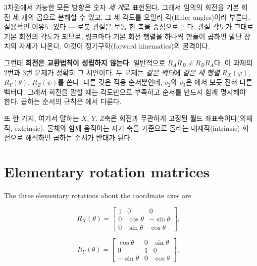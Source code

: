 3차원에서 가능한 모든 방향은 숫자 \emph{세 개}로 표현된다. 그래서 임의의 회전을
기본 회전 세 개의 곱으로 분해할 수 있고, 그 세 각도를 오일러 각(Euler angles)이라
부른다. 실용적인 이유도 있다 --- 로봇 관절은 보통 한 축을 중심으로 돈다. 관절 각도가
그대로 기본 회전의 각도가 되므로, 링크마다 기본 회전 행렬을 하나씩 만들어 곱하면
말단 장치의 자세가 나온다. 이것이 정기구학(forward kinematics)의 골격이다.

그런데 \textbf{회전은 교환법칙이 성립하지 않는다}. 일반적으로
$R_A R_B \neq R_B R_A$다. 이 과제의 2번과 3번 문제가 정확히 그 시연이다. 두 문제는
\emph{같은 벡터}에 \emph{같은 세 행렬} $R_X(\varphi)$, $R_Y(\theta)$,
$R_Z(\psi)$를 쓴다. 다른 것은 적용 순서뿐인데, $v_2$와 $v_3$은
에서 보듯 전혀 다른 벡터다. 그래서 회전을 말할 때는 각도만으로
부족하고 순서를 반드시 함께 명시해야 한다. 곱하는 순서의 규칙은
에서 다룬다.

또 한 가지, 여기서 말하는 $X$, $Y$, $Z$축은 회전과 무관하게 고정된 월드
좌표축이다(외재적, extrinsic). 물체와 함께 움직이는 자기 축을 기준으로 돌리는
내재적(intrinsic) 회전으로 해석하면 곱하는 순서가 반대가 된다.


\section{Elementary rotation matrices}
\label{sec:hw2-matrices}

The three elementary rotations about the coordinate axes are

\begin{equation}
\label{eq:hw2-rx}
R_X(\theta) =
\begin{bmatrix}
1 & 0 & 0 \\
0 & \cos\theta & -\sin\theta \\
0 & \sin\theta & \cos\theta
\end{bmatrix},
\end{equation}

\begin{equation}
\label{eq:hw2-ry}
R_Y(\theta) =
\begin{bmatrix}
\cos\theta & 0 & \sin\theta \\
0 & 1 & 0 \\
-\sin\theta & 0 & \cos\theta
\end{bmatrix},
\end{equation}

